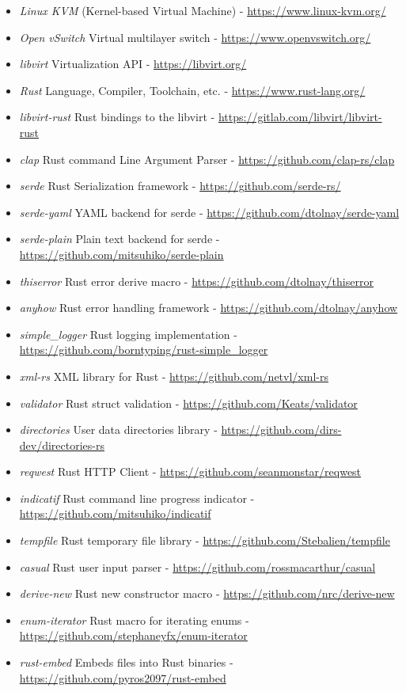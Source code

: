 \documentclass[
    author={Jacob Daniel Halsey},
    supervisor={Prof. Awais Rashid},
    degree={BSc},
    title={Building a Testbed for Evaluating Privacy Enhancing Technologies  (PETs)},
    subtitle={},
    type={software development},
    year={2021}
]{dissertation}
\begin{document}
\begin{singlespace}
	\begin{itemize}
		\item \emph{Linux KVM} (Kernel-based Virtual Machine) - \url{https://www.linux-kvm.org/}
		\item \emph{Open vSwitch} Virtual multilayer switch - \url{https://www.openvswitch.org/}
		\item \emph{libvirt} Virtualization API - \url{https://libvirt.org/}
		\item \emph{Rust} Language, Compiler, Toolchain, etc. - \url{https://www.rust-lang.org/}
		\item \emph{libvirt-rust} Rust bindings to the libvirt - \url{https://gitlab.com/libvirt/libvirt-rust}
		\item \emph{clap} Rust command Line Argument Parser - \url{https://github.com/clap-rs/clap}
		\item \emph{serde} Rust Serialization framework - \url{https://github.com/serde-rs/}
		\item \emph{serde-yaml} YAML backend for serde - \url{https://github.com/dtolnay/serde-yaml}
		\item \emph{serde-plain} Plain text backend for serde - \url{https://github.com/mitsuhiko/serde-plain}
		\item \emph{thiserror} Rust error derive macro - \url{https://github.com/dtolnay/thiserror}
		\item \emph{anyhow} Rust error handling framework - \url{https://github.com/dtolnay/anyhow}
		\item \emph{simple\_logger} Rust logging implementation - \url{https://github.com/borntyping/rust-simple_logger}
		\item \emph{xml-rs} XML library for Rust - \url{https://github.com/netvl/xml-rs}
		\item \emph{validator} Rust struct validation - \url{https://github.com/Keats/validator}
		\item \emph{directories} User data directories library - \url{https://github.com/dirs-dev/directories-rs}
		\item \emph{reqwest} Rust HTTP Client - \url{https://github.com/seanmonstar/reqwest}
		\item \emph{indicatif} Rust command line progress indicator - \url{https://github.com/mitsuhiko/indicatif}
		\item \emph{tempfile} Rust temporary file library - \url{https://github.com/Stebalien/tempfile}
		\item \emph{casual} Rust user input parser - \url{https://github.com/rossmacarthur/casual}
		\item \emph{derive-new} Rust new constructor macro - \url{https://github.com/nrc/derive-new}
		\item \emph{enum-iterator} Rust macro for iterating enums - \url{https://github.com/stephaneyfx/enum-iterator}
		\item \emph{rust-embed} Embeds files into Rust binaries - \url{https://github.com/pyros2097/rust-embed}
	\end{itemize}
\end{singlespace}
\end{document}
